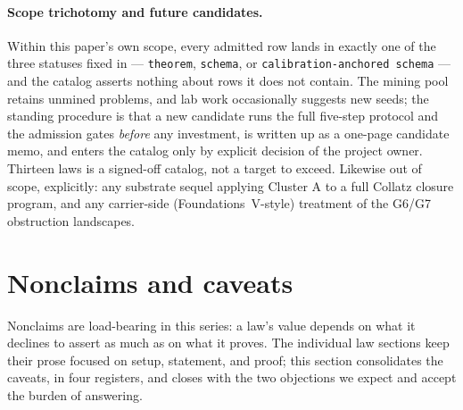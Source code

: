 \documentclass[11pt]{article}
\theoremstyle{definition}
\begin{document}
\paragraph{Scope trichotomy and future candidates.} Within this paper's own scope, every admitted
row lands in exactly one of the three statuses fixed in  --- \texttt{theorem},
\texttt{schema}, or \texttt{calibration-anchored schema} --- and the catalog asserts nothing about
rows it does not contain. The mining pool retains unmined problems, and lab work occasionally
suggests new seeds; the standing procedure is that a new candidate runs the full five-step protocol
and the admission gates \emph{before} any investment, is written up as a one-page candidate memo,
and enters the catalog only by explicit decision of the project owner. Thirteen laws is a signed-off
catalog, not a target to exceed. Likewise out of scope, explicitly: any substrate sequel applying
Cluster A to a full Collatz closure program, and any carrier-side (Foundations~V-style) treatment of
the G6/G7 obstruction landscapes.

\section{Nonclaims and caveats}\label{sec:nonclaims}

Nonclaims are load-bearing in this series: a law's value depends on what it declines to assert as
much as on what it proves. The individual law sections keep their prose focused on setup, statement,
and proof; this section consolidates the caveats, in four registers, and closes with the two
objections we expect and accept the burden of answering.
\end{document}
